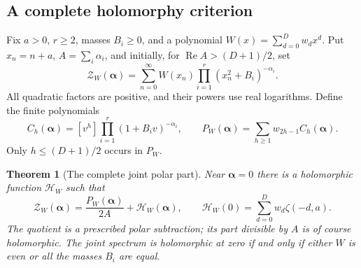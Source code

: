 \documentclass[11pt,letterpaper]{article}
\numberwithin{equation}{section}
\newtheorem{theorem}{Theorem}[section]
\theoremstyle{definition}
\theoremstyle{remark}
\DeclareMathOperator{\Ree}{Re}
\begin{document}
\subsection{A complete holomorphy criterion}

Fix $a>0$, $r\ge2$, masses $B_i\ge0$, and a polynomial
$W(x)=\sum_{d=0}^Dw_dx^d$.  Put $x_n=n+a$, $A=\sum_i\alpha_i$,
and initially, for $\Ree A>(D+1)/2$, set
\begin{equation}\label{sfj:eq:joint}
 \mathscr Z_W(\boldsymbol\alpha)
    =\sum_{n=0}^\infty W(x_n)
                  \prod_{i=1}^r(x_n^2+B_i)^{-\alpha_i}.
\end{equation}
All quadratic factors are positive, and their powers use real
logarithms.  Define the finite polynomials
\begin{equation}\label{sfj:eq:polar-poly}
 C_h(\boldsymbol\alpha)
  =[v^h]\prod_{i=1}^r(1+B_iv)^{-\alpha_i},\qquad
 P_W(\boldsymbol\alpha)=\sum_{h\ge1}w_{2h-1}C_h(\boldsymbol\alpha).
\end{equation}
Only $h\le(D+1)/2$ occurs in $P_W$.

\begin{theorem}[The complete joint polar part]
\label{sfj:thm:pole}
Near $\boldsymbol\alpha=0$ there is a holomorphic function
$\mathscr H_W$ such that
\begin{equation}\label{sfj:eq:pole}
 \boxed{\displaystyle
 \mathscr Z_W(\boldsymbol\alpha)
     =\frac{P_W(\boldsymbol\alpha)}{2A}
                         +\mathscr H_W(\boldsymbol\alpha),\qquad
 \mathscr H_W(0)=\sum_{d=0}^D w_d\zeta(-d,a).}
\end{equation}
The quotient is a prescribed polar subtraction; its part divisible
by $A$ is of course holomorphic.  The joint spectrum is holomorphic
at zero if and only if either $W$ is even or all the masses $B_i$
are equal.
\end{theorem}
\end{document}
